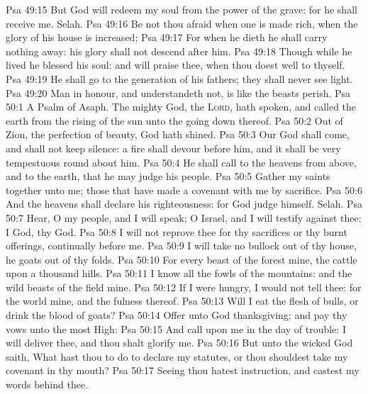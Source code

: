 \vs Psa 49:15 But God will redeem my soul from the power of the grave: for he shall receive me. Selah.
\vs Psa 49:16 Be not thou afraid when one is made rich, when the glory of his house is increased;
\vs Psa 49:17 For when he dieth he shall carry nothing away: his glory shall not descend after him.
\vs Psa 49:18 Though while he lived he blessed his soul: and  will praise thee, when thou doest well to thyself.
\vs Psa 49:19 He shall go to the generation of his fathers; they shall never see light.
\vs Psa 49:20 Man  in honour, and understandeth not, is like the beasts  perish.
\vs Psa 50:1 A Psalm of Asaph. The mighty God,  the \textsc{Lord}, hath spoken, and called the earth from the rising of the sun unto the going down thereof.
\vs Psa 50:2 Out of Zion, the perfection of beauty, God hath shined.
\vs Psa 50:3 Our God shall come, and shall not keep silence: a fire shall devour before him, and it shall be very tempestuous round about him.
\vs Psa 50:4 He shall call to the heavens from above, and to the earth, that he may judge his people.
\vs Psa 50:5 Gather my saints together unto me; those that have made a covenant with me by sacrifice.
\vs Psa 50:6 And the heavens shall declare his righteousness: for God  judge himself. Selah.
\vs Psa 50:7 Hear, O my people, and I will speak; O Israel, and I will testify against thee: I  God,  thy God.
\vs Psa 50:8 I will not reprove thee for thy sacrifices or thy burnt offerings,  continually before me.
\vs Psa 50:9 I will take no bullock out of thy house,  he goats out of thy folds.
\vs Psa 50:10 For every beast of the forest  mine,  the cattle upon a thousand hills.
\vs Psa 50:11 I know all the fowls of the mountains: and the wild beasts of the field  mine.
\vs Psa 50:12 If I were hungry, I would not tell thee: for the world  mine, and the fulness thereof.
\vs Psa 50:13 Will I eat the flesh of bulls, or drink the blood of goats?
\vs Psa 50:14 Offer unto God thanksgiving; and pay thy vows unto the most High:
\vs Psa 50:15 And call upon me in the day of trouble: I will deliver thee, and thou shalt glorify me.
\vs Psa 50:16 But unto the wicked God saith, What hast thou to do to declare my statutes, or  thou shouldest take my covenant in thy mouth?
\vs Psa 50:17 Seeing thou hatest instruction, and castest my words behind thee.
